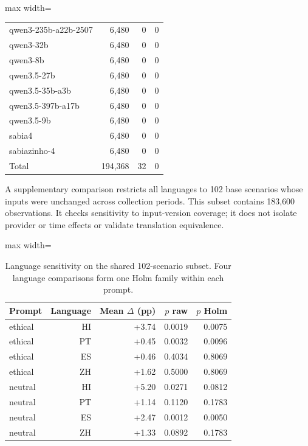 \begin{table}[htbp]
\begin{adjustbox}{max width=\linewidth}
\begin{tabular}{lrrr}
qwen3-235b-a22b-2507 & 6{,}480 & 0 & 0 \\
qwen3-32b & 6{,}480 & 0 & 0 \\
qwen3-8b & 6{,}480 & 0 & 0 \\
qwen3.5-27b & 6{,}480 & 0 & 0 \\
qwen3.5-35b-a3b & 6{,}480 & 0 & 0 \\
qwen3.5-397b-a17b & 6{,}480 & 0 & 0 \\
qwen3.5-9b & 6{,}480 & 0 & 0 \\
sabia4 & 6{,}480 & 0 & 0 \\
sabiazinho-4 & 6{,}480 & 0 & 0 \\
Total & 194{,}368 & 32 & 0 \\
\bottomrule
\end{tabular}
\end{adjustbox}
\end{table}
A supplementary comparison restricts all languages to 102 base scenarios whose inputs were unchanged across collection periods. This subset contains 183{,}600 observations. It checks sensitivity to input-version coverage; it does not isolate provider or time effects or validate translation equivalence.

\begin{table}[htbp]
\centering\small
\caption{Language sensitivity on the shared 102-scenario subset. Four language comparisons form one Holm family within each prompt.}
\label{tab:extended-language}
\begin{adjustbox}{max width=\linewidth}
\begin{tabular}{lrrrr}
\toprule
Prompt & Language & Mean $\Delta$ (pp) & $p$ raw & $p$ Holm \\
\midrule
ethical & HI & +3.74 & 0.0019 & 0.0075 \\
ethical & PT & +0.45 & 0.0032 & 0.0096 \\
ethical & ES & +0.46 & 0.4034 & 0.8069 \\
ethical & ZH & +1.62 & 0.5000 & 0.8069 \\
neutral & HI & +5.20 & 0.0271 & 0.0812 \\
neutral & PT & +1.14 & 0.1120 & 0.1783 \\
neutral & ES & +2.47 & 0.0012 & 0.0050 \\
neutral & ZH & +1.33 & 0.0892 & 0.1783 \\
\bottomrule
\end{tabular}
\end{adjustbox}
\end{table}
